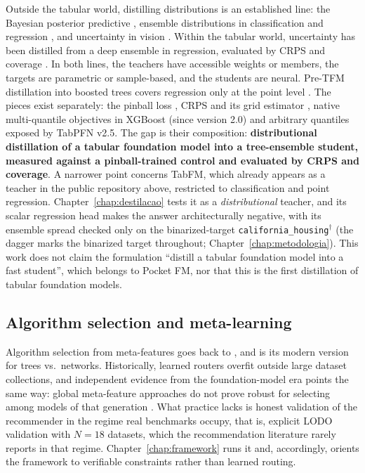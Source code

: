 Outside the tabular world, distilling distributions is an established line: the Bayesian posterior predictive
\citep{korattikara2015}, ensemble distributions in classification
\citep{malinin2020end2} and regression \citep{malinin2020rpn}, and
uncertainty in vision \citep{shen2021}. Within the tabular world,
uncertainty has been distilled from a deep ensemble in regression,
evaluated by CRPS and coverage \citep{park2025uncertainty}. In both
lines, the teachers have accessible weights or members, the targets
are parametric or sample-based, and the students are neural.
Pre-TFM distillation into boosted trees covers
regression only at the point level \citep{fakoor2020}. The pieces
exist separately: the pinball loss \citep{koenker1978}, CRPS and its
grid estimator \citep{gneiting2007,gneiting2011}, native
multi-quantile objectives in XGBoost (since version 2.0) and
arbitrary quantiles exposed by TabPFN v2.5. The gap is their
composition: \textbf{distributional distillation of a tabular
foundation model into a tree-ensemble student, measured against a
pinball-trained control and evaluated by CRPS and coverage}. A
narrower point concerns TabFM, which already appears as a teacher in the
public repository above, restricted to classification and point
regression. Chapter~\ref{chap:destilacao} tests it as a
\emph{distributional} teacher, and its scalar regression head
\citep{kong2026} makes the answer architecturally negative, with its
ensemble spread checked only on the binarized-target
\texttt{california\_\allowbreak housing}$^\dagger$ (the dagger
marks the binarized target throughout;
Chapter~\ref{chap:metodologia}). This work does not claim the formulation ``distill a tabular foundation model into a fast student'', which belongs to Pocket FM, nor that this is the first distillation of tabular foundation models.

\subsection{Algorithm selection and meta-learning}
\label{sec:rel-selecao}

Algorithm selection from meta-features goes back to
\citet{rice1976}, and \citet{mcelfresh2023} is its modern version for
trees vs.\ networks. Historically, learned routers overfit outside
large dataset collections, and independent evidence from the
foundation-model era points the same way: global meta-feature
approaches do not prove robust for selecting among models of that
generation \citep{herre2026}. What practice lacks is honest
validation of the recommender in the regime real benchmarks
occupy, that is, explicit LODO validation with $N{=}18$ datasets, which the recommendation literature rarely reports in that regime. Chapter~\ref{chap:framework} runs it and, accordingly,
orients the framework to verifiable constraints rather than learned
routing.

